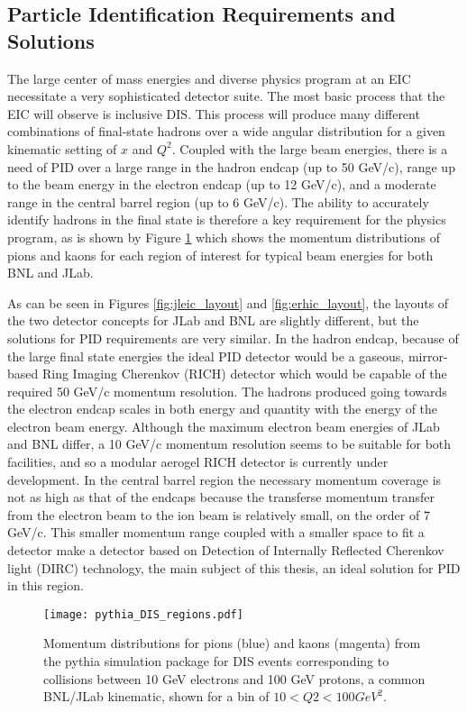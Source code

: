 \subsection{Particle Identification Requirements and Solutions}
The large center of mass energies and diverse physics program at an EIC necessitate a very sophisticated detector suite. The most basic process that the EIC will observe is inclusive DIS. This process will produce many different combinations of final-state hadrons over a wide angular distribution for a given kinematic setting of $x$ and $Q^2$. Coupled with the large beam energies, there is a need of PID over a large range in the hadron endcap (up to 50 GeV/c), range up to the beam energy in the electron endcap (up to 12 GeV/c), and a moderate range in the central barrel region (up to 6 GeV/c). The ability to accurately identify hadrons in the final state is therefore a key requirement for the physics program, as is shown by Figure \ref{fig:pythia_DIS} which shows the momentum distributions of pions and kaons for each region of interest for typical beam energies for both BNL and JLab.

As can be seen in Figures \ref{fig:jleic_layout} and \ref{fig:erhic_layout}, the layouts of the two detector concepts for JLab and BNL are slightly different, but the solutions for PID requirements are very similar. In the hadron endcap, because of the large final state energies the ideal PID detector would be a gaseous, mirror-based Ring Imaging Cherenkov (RICH) detector which would be capable of the required 50 GeV/c momentum resolution. The hadrons produced going towards the electron endcap scales in both energy and quantity with the energy of the electron beam energy. Although the maximum electron beam energies of JLab and BNL differ, a 10 GeV/c momentum resolution seems to be suitable for both facilities, and so a modular aerogel RICH detector is currently under development. In the central barrel region the necessary momentum coverage is not as high as that of the endcaps because the transferse momentum transfer from the electron beam to the ion beam is relatively small, on the order of 7 GeV/c. This smaller momentum range coupled with a smaller space to fit a detector make a detector based on Detection of Internally Reflected Cherenkov light (DIRC) technology, the main subject of this thesis, an ideal solution for PID in this region.


\begin{figure}[ht]
	\centering
	\texttt{[image: pythia\_DIS\_regions.pdf]}
	\caption{Momentum distributions for pions (blue) and kaons (magenta) from the pythia simulation package for DIS events corresponding to collisions between 10 GeV electrons and 100 GeV protons, a common BNL/JLab kinematic, shown for a bin of $10<Q2<100\unit{GeV}^2$.}
	\label{fig:pythia_DIS}
\end{figure}


